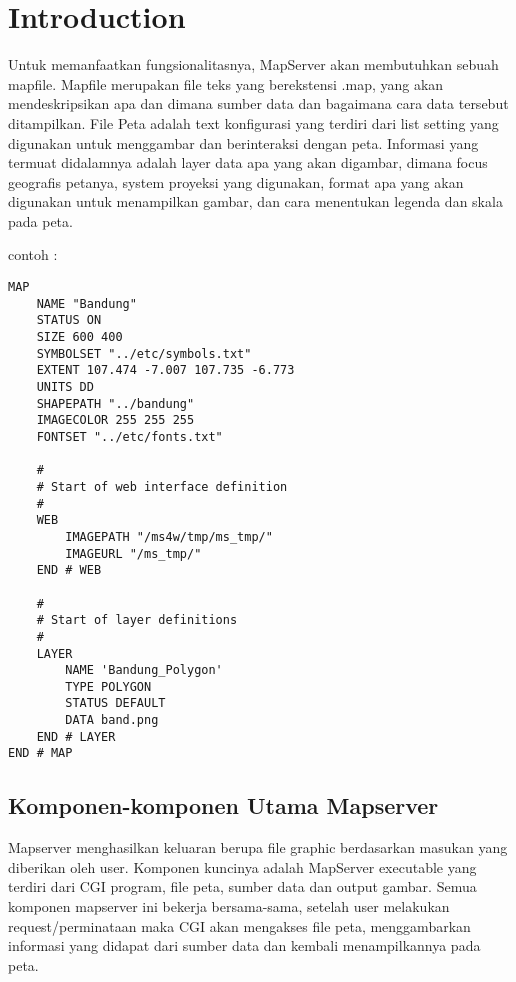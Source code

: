 ﻿\section{Introduction}

Untuk memanfaatkan fungsionalitasnya, MapServer akan membutuhkan sebuah mapfile. Mapfile merupakan file teks yang berekstensi .map,
yang akan mendeskripsikan apa dan dimana sumber data dan bagaimana cara data tersebut ditampilkan. 
File Peta adalah text konfigurasi yang terdiri dari list setting yang digunakan untuk menggambar dan berinteraksi dengan peta. 
Informasi yang termuat didalamnya adalah layer data apa yang akan digambar, dimana focus geografis petanya, 
system proyeksi yang digunakan, format apa yang akan digunakan untuk menampilkan gambar, dan cara menentukan legenda dan skala pada peta.

contoh :
\begin{verbatim}
MAP
    NAME "Bandung"
    STATUS ON
    SIZE 600 400
    SYMBOLSET "../etc/symbols.txt"
    EXTENT 107.474 -7.007 107.735 -6.773
    UNITS DD
    SHAPEPATH "../bandung"
    IMAGECOLOR 255 255 255
    FONTSET "../etc/fonts.txt"

    #
    # Start of web interface definition
    #
    WEB
        IMAGEPATH "/ms4w/tmp/ms_tmp/"
        IMAGEURL "/ms_tmp/"
    END # WEB

    #
    # Start of layer definitions
    #
    LAYER
        NAME 'Bandung_Polygon'
        TYPE POLYGON
        STATUS DEFAULT
        DATA band.png
    END # LAYER
END # MAP
\end{verbatim}

\subsection{Komponen-komponen Utama Mapserver}
Mapserver menghasilkan keluaran berupa file graphic berdasarkan masukan yang diberikan oleh user. Komponen kuncinya adalah MapServer executable yang terdiri dari CGI program, file peta, sumber data dan output gambar. Semua komponen mapserver ini bekerja bersama-sama, setelah user melakukan request/perminataan maka CGI akan mengakses file peta, menggambarkan informasi yang didapat dari sumber data dan kembali menampilkannya pada peta.

